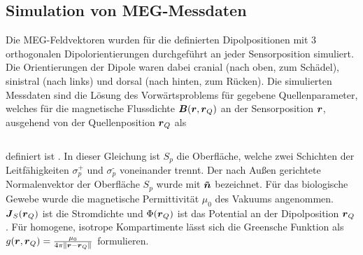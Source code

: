 \subsection{Simulation von MEG-Messdaten}
Die MEG-Feldvektoren wurden für die definierten Dipolpositionen mit 3
orthogonalen Dipolorientierungen durchgeführt an jeder Sensorposition
simuliert. Die Orientierungen der Dipole waren dabei cranial (nach
oben, zum Schädel), sinistral (nach links) und dorsal (nach hinten, zum
Rücken). Die simulierten Messdaten sind die Lösung des Vorwärtsproblems
für gegebene Quellenparameter, welches für die magnetische Flussdichte
$\boldsubformula{B}(\boldsubformula{r},\boldsubformula{r}_{Q})$ an der
Sensorposition $\boldsubformula{r}$, ausgehend von der Quellenposition
$\boldsubformula{r}_{Q}$ als

\begin{center}
\begin{supertabular}{m{14.909cm}m{1.689cm}}

\end{supertabular}
\end{center}
definiert ist \cite{a3}. In dieser Gleichung ist $S_{p}$ die Oberfläche,
welche zwei Schichten der Leitfähigkeiten $\sigma _{p}^{\text{+}}$ und
$\sigma _{p}^{\text{{}-}}$ voneinander trennt. Der nach Außen
gerichtete Normalenvektor der Oberfläche $S_{p}$ wurde mit
$\boldsubformula{{\tilde {n}}}$ bezeichnet. Für das biologische Gewebe
wurde die magnetische Permittivität $\mu _{0}$ des Vakuums angenommen. 
$\boldsubformula{J}_{S}(\boldsubformula{r}_{Q})$ ist die Stromdichte
und $\Phi (\boldsubformula{r}_{Q})$ ist das Potential an der
Dipolposition $\boldsubformula{r}_{Q}$ . Für homogene, isotrope
Kompartimente lässt sich die Greensche Funktion als
$g(\boldsubformula{r},\boldsubformula{r}_{Q})=\frac{\mu _{0}}{4\pi
\|\boldsubformula{r}-\boldsubformula{r}_{Q}\|}$ formulieren.



